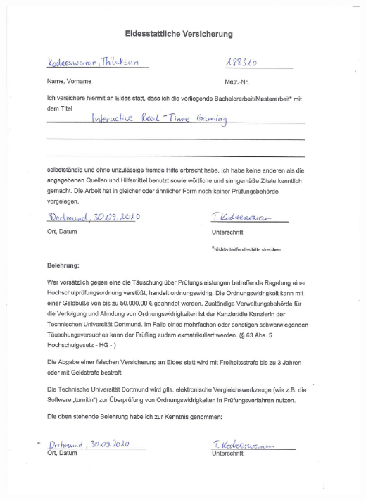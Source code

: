 \pagestyle{empty}
\includegraphics[trim = 20mm 20mm 20mm 10mm, clip,
width=\textwidth]{Thilaksan_Eidesstattliche_Versicherung.pdf}


%


